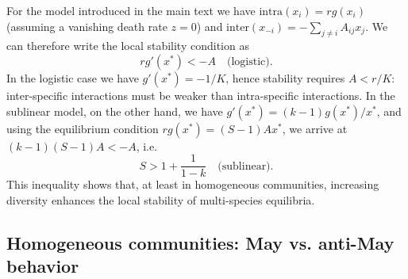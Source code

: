 \documentclass[12pt]{article}
\newcommand{\inter}{\textrm{inter}}
\newcommand{\intra}{\textrm{intra}}
\begin{document}
For the model introduced in the main text we have $\intra(x_i) = rg(x_i)$ (assuming a vanishing death rate $z = 0$) and $\inter(x_{-i}) = -\sum_{j\neq i}A_{ij} x_j$. We can therefore write the local stability condition as
\begin{equation}
    rg'(x^*) < - A \quad \textrm{(logistic)}.
\end{equation}
In the logistic case we have $g'(x^*) = -1/K$, hence stability requires $A < r/K$: inter-specific interactions must be weaker than intra-specific interactions. In the sublinear model, on the other hand, we have $g'(x^*) = (k-1)g(x^*)/x^*$, and using the equilibrium condition $rg(x^*) = (S-1)Ax^*$, we arrive at $(k-1)(S-1)A < - A$, i.e. 
\begin{equation}
    S > 1 + \frac{1}{1-k} \quad \textrm{(sublinear)}.
\end{equation}
This inequality shows that, at least in homogeneous communities, increasing diversity enhances the local stability of multi-species equilibria. 

\subsection{Homogeneous communities: May vs. anti-May behavior}
\end{document}
